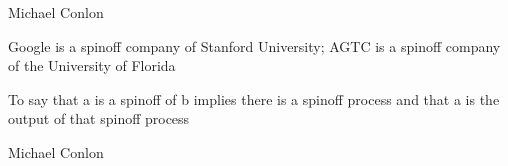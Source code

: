 \documentclass[letterpaper,10pt,english]{sphinxmanual}
\begin{document}
\begin{sphinxShadowBox}

\sphinxAtStartPar
Michael Conlon 
\end{sphinxShadowBox}

\begin{sphinxShadowBox}

\sphinxAtStartPar
{\hyperref[\detokenize{doc-ORG_0000001::doc}]{}}
\end{sphinxShadowBox}

\begin{sphinxShadowBox}

\sphinxAtStartPar
{\hyperref[\detokenize{doc-ORG_0000001::doc}]{}}
\end{sphinxShadowBox}

\begin{sphinxShadowBox}

\sphinxAtStartPar
{\hyperref[\detokenize{doc-ORG_2000013::doc}]{}}
\end{sphinxShadowBox}

\begin{sphinxShadowBox}

\sphinxAtStartPar
Google is a spin\sphinxhyphen{}off company of Stanford University; AGTC is a spin\sphinxhyphen{}off company of the University of Florida
\end{sphinxShadowBox}

\begin{sphinxShadowBox}

\sphinxAtStartPar
To say that a is a spin\sphinxhyphen{}off of b implies there is a spin\sphinxhyphen{}off process and that a is the output of that spin\sphinxhyphen{}off process
\end{sphinxShadowBox}

\begin{sphinxShadowBox}

\sphinxAtStartPar
Michael Conlon 
\end{sphinxShadowBox}
\begin{quote}

\ignorespaces \end{quote}
\end{document}
